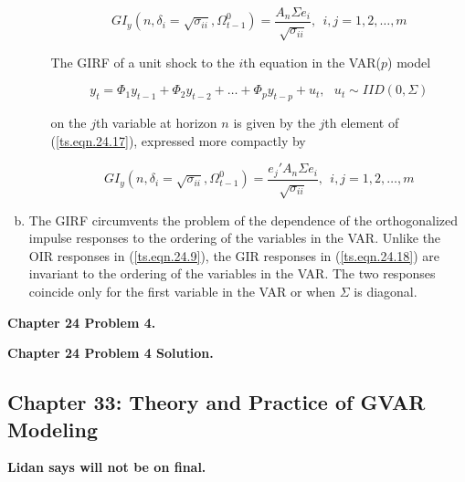 \begin{enumerate}[(a)]
\begin{itemize}
\begin{equation}\label{ts.eqn.24.17}
GI_y(n, \delta_i  = \sqrt{\sigma_{ii}}, \Omega_{t-1}^0) = \frac{A_n \Sigma e_i}{\sqrt{\sigma_{ii}}}, \ \ i, j = 1, 2, \ldots, m
\end{equation}

The GIRF of a unit shock to the \(i\)th equation in the VAR(\(p\)) model 

\begin{equation}\label{ts.eqn.24.1}
y_t = \Phi_1 y_{t-1} + \Phi_2 y_{t-2} + \ldots + \Phi_p y_{t-p} + u_t, \ \ \ u_t \sim IID(0, \Sigma)
\end{equation}

on the \(j\)th variable at horizon \(n\) is given by the \(j\)th element of (\ref{ts.eqn.24.17}), expressed more compactly by

\begin{equation}\label{ts.eqn.24.18}
GI_y(n, \delta_i  = \sqrt{\sigma_{ii}}, \Omega_{t-1}^0) = \frac{e_j'A_n \Sigma e_i}{\sqrt{\sigma_{ii}}}, \ \ i, j = 1, 2, \ldots, m
\end{equation}

\end{itemize}

\item The GIRF circumvents the problem of the dependence of the orthogonalized impulse responses to the ordering of the variables in the VAR. Unlike the OIR responses in (\ref{ts.eqn.24.9}), the GIR responses in (\ref{ts.eqn.24.18}) are invariant to the ordering of the variables in the VAR. The two responses coincide only for the first variable in the VAR or when \(\Sigma\) is diagonal. 

\end{enumerate}



\textbf{Chapter 24 Problem 4.}



\textbf{Chapter 24 Problem 4 Solution.}

%
%
%
%
%
%

\subsection{Chapter 33: Theory and Practice of GVAR Modeling}

\textbf{Lidan says will not be on final.}



%
%
%
%
%
%
%
%
%